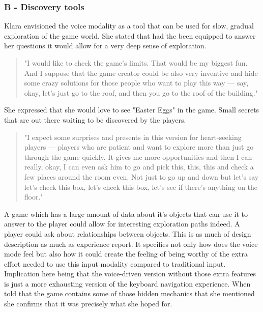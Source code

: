 \subsubsection{B - Discovery tools}

Klara envisioned the voice modality as a tool that can be used for slow, gradual exploration of the game world. She stated that had the been equipped to answer her questions it would allow for a very deep sense of exploration.

\begin{quote}
    "I would like to check the game's limits. That would be my biggest fun. And I suppose that the game creator could be also very inventive and hide some crazy solutions for those people who want to play this way — say, okay, let's just go to the roof, and then you go to the roof of the building."
\end{quote}

She expressed that she would love to see "Easter Eggs" in the game. Small secrets that are out there waiting to be discovered by the players. 
\begin{quote}
    "I expect some surprises and presents in this version for heart-seeking players — players who are patient and want to explore more than just go through the game quickly. It gives me more opportunities and then I can really, okay, I can even ask him to go and pick this, this, this and check a few places around the room even. Not just to go up and down but let's say let's check this box, let's check this box, let's see if there's anything on the floor."
\end{quote}

A game which has a large amount of data about it's objects that can use it to answer to the player could allow for interesting exploration paths indeed. A player could ask about relationships between objects. This is as much of design description as much as experience report. It specifies not only how does the voice mode feel but also how it could create the feeling of being worthy of the extra effort needed to use this input modality compared to traditional input. Implication here being that the voice-driven version without those extra features is just a more exhausting version of the keyboard navigation experience. When told that the game contains some of those hidden mechanics that she mentioned she confirms that it was precisely what she hoped for. 

